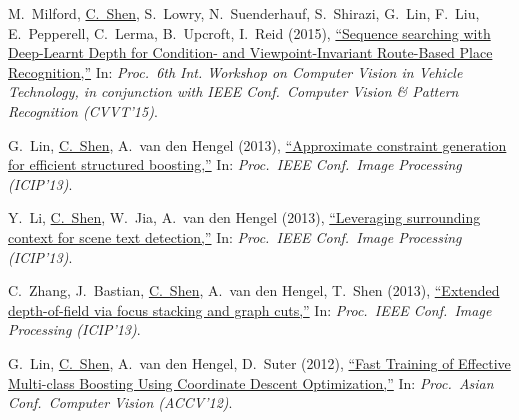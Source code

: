 \documentclass[9pt, a4paper]{article}
\newcommand{\years}[1]{\marginnote{\scriptsize #1}}
\def\highlight{\uline}
\begin{document}
\medskip

\years{2015} M.~Milford, \highlight{C.~Shen}, S.~Lowry, N.~Suenderhauf, S.~Shirazi, G.~Lin, F.~Liu, E.~Pepperell, C.~Lerma, B.~Upcroft, I.~Reid (2015),
\href{http://www.google.com/search?lr=&ie=UTF-8&oe=UTF-8&q=Sequence+searching+with+Deep-Learnt+Depth+for+Condition-+and+Viewpoint-Invariant+Route-Based+Place+Recognition+Michael+Milford%2C+Chunhua+Shen%2C+Stephanie+Lowry%2C+Niko+Suenderhauf%2C+Sareh+Shirazi%2C+Guosheng+Lin%2C+Fayao+Liu%2C+Edward+Pepperell%2C+Cesar+Lerma%2C+Ben+Upcroft%2C+Ian+Reid}{``Sequence searching with Deep-Learnt Depth for Condition- and Viewpoint-Invariant Route-Based Place Recognition,{}''}
In: \emph{Proc.\ 6th Int. Workshop on Computer Vision in Vehicle Technology, in conjunction with IEEE Conf.\  Computer Vision \& Pattern Recognition (CVVT'15)}.

\medskip

\years{2013} G.~Lin, \highlight{C.~Shen}, A.~van den Hengel (2013),
\href{http://www.google.com/search?lr=&ie=UTF-8&oe=UTF-8&q=Approximate+constraint+generation+for+efficient+structured+boosting+Guosheng+Lin%2C+Chunhua+Shen%2C+Anton+van+den+Hengel}{``Approximate constraint generation for efficient structured boosting,{}''}
In: \emph{Proc.\ IEEE Conf.\  Image Processing (ICIP'13)}.

\medskip

\years{2013} Y.~Li, \highlight{C.~Shen}, W.~Jia, A.~van den Hengel (2013),
\href{http://www.google.com/search?lr=&ie=UTF-8&oe=UTF-8&q=Leveraging+surrounding+context+for+scene+text+detection+Yao+Li%2C+Chunhua+Shen%2C+Wenjing+Jia%2C+Anton+van+den+Hengel}{``Leveraging surrounding context for scene text detection,{}''}
In: \emph{Proc.\ IEEE Conf.\  Image Processing (ICIP'13)}.

\medskip

\years{2013} C.~Zhang, J.~Bastian, \highlight{C.~Shen}, A.~van den Hengel, T.~Shen (2013),
\href{http://www.google.com/search?lr=&ie=UTF-8&oe=UTF-8&q=Extended+depth-of-field+via+focus+stacking+and+graph+cuts+Chao+Zhang%2C+John+Bastian%2C+Chunhua+Shen%2C+Anton+van+den+Hengel%2C+Tingzhi+Shen}{``Extended depth-of-field via focus stacking and graph cuts,{}''}
In: \emph{Proc.\ IEEE Conf.\  Image Processing (ICIP'13)}.

\medskip

\years{2012} G.~Lin, \highlight{C.~Shen}, A.~van den Hengel, D.~Suter (2012),
\href{http://www.google.com/search?lr=&ie=UTF-8&oe=UTF-8&q=Fast+Training+of+Effective+Multi-class+Boosting+Using+Coordinate+Descent+Optimization+Guosheng+Lin%2C+Chunhua+Shen%2C+Anton+van+den+Hengel%2C+David+Suter}{``Fast Training of Effective Multi-class Boosting Using Coordinate Descent Optimization,{}''}
In: \emph{Proc.\ Asian Conf.\  Computer Vision (ACCV'12)}.
\end{document}
